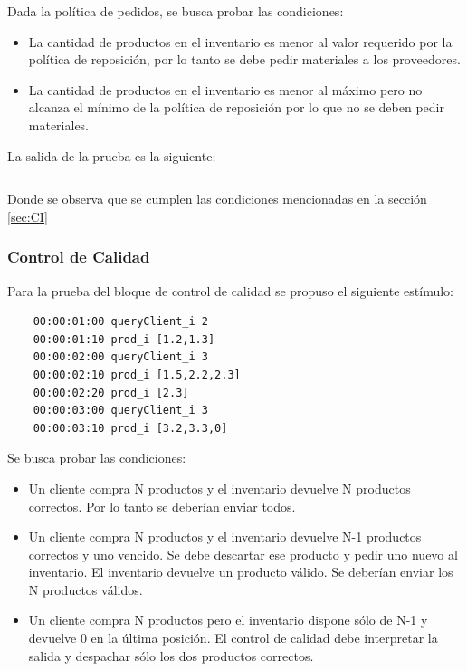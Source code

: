 \documentclass[10pt]{article}
\begin{document}
Dada la política de pedidos, se busca probar las condiciones:
\begin{itemize}
\item La cantidad de productos en el inventario es menor al valor requerido por la política de reposición, por lo tanto se debe pedir materiales a los proveedores.
\item  La cantidad de productos en el inventario es menor al máximo pero no alcanza el mínimo de la política de reposición por lo que no se deben pedir materiales.
\end{itemize}

La salida de la prueba es la siguiente:

\begin{minipage}{1\textwidth}
	\centering
	\begin{lstlisting}

	\end{lstlisting}
	
\end{minipage}
Donde se observa que se cumplen las condiciones mencionadas en la sección \ref{sec:CI}

\subsubsection{Control de Calidad}
Para la prueba del bloque de control de calidad se propuso el siguiente estímulo:

\begin{minipage}{1\textwidth}
	\centering
	\begin{lstlisting}
	00:00:01:00 queryClient_i 2
	00:00:01:10 prod_i [1.2,1.3]
	00:00:02:00 queryClient_i 3
	00:00:02:10 prod_i [1.5,2.2,2.3]
	00:00:02:20 prod_i [2.3]
	00:00:03:00 queryClient_i 3
	00:00:03:10 prod_i [3.2,3.3,0]
	\end{lstlisting}
	
	\centering
\end{minipage}

Se busca probar las condiciones:
\begin{itemize}
	\item Un cliente compra N productos y el inventario devuelve N productos correctos. Por lo tanto se deberían enviar todos.
	\item Un cliente compra N productos y el inventario devuelve N-1 productos correctos y uno vencido. Se debe descartar ese producto y pedir uno nuevo al inventario. El inventario devuelve un producto válido. Se deberían enviar los N productos válidos.
	\item Un cliente compra N productos pero el inventario dispone sólo de N-1 y devuelve 0 en la última posición. El control de calidad debe interpretar la salida y despachar sólo los dos productos correctos.
\end{itemize}
\end{document}
